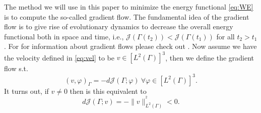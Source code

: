 The method we will use in this paper to minimize the energy functional \eqref{eq:WE} is to compute the so-called gradient flow. The fundamental idea of the gradient flow is to give rise of evolutionary dynamics to decrease the overall energy
functional both in space and time, i.e., $\mathcal{J}\left( \Gamma \left( t_{2} \right)  \right) <   \mathcal{J}\left( \Gamma \left( t_{1} \right)\right)$ for all  $t_{2} > t_{1}$. For for information about gradient flows please check out
    \cite{dogan2007discrete, dogan2005finite}. Now assume we have the velocity defined in \eqref{eq:vel} to be $v \in \left[ L^{2}\left( \Gamma  \right)  \right]^3 $, then we define the gradient flow s.t. \[
      \left( v,\varphi  \right) _{\Gamma  }  = - d \mathcal{J} \left( \Gamma ; \varphi  \right) \  \forall \varphi \in \left[ L^2\left( \Gamma  \right)   \right] ^3.
    \]
    It turns out, if $v \neq 0$ then is this equivalent to
\[
d \mathcal{J} \left( \Gamma ; v \right) = -\| v \|_{ L^2\left( \Gamma  \right)  }^{^2  } < 0.
\]








